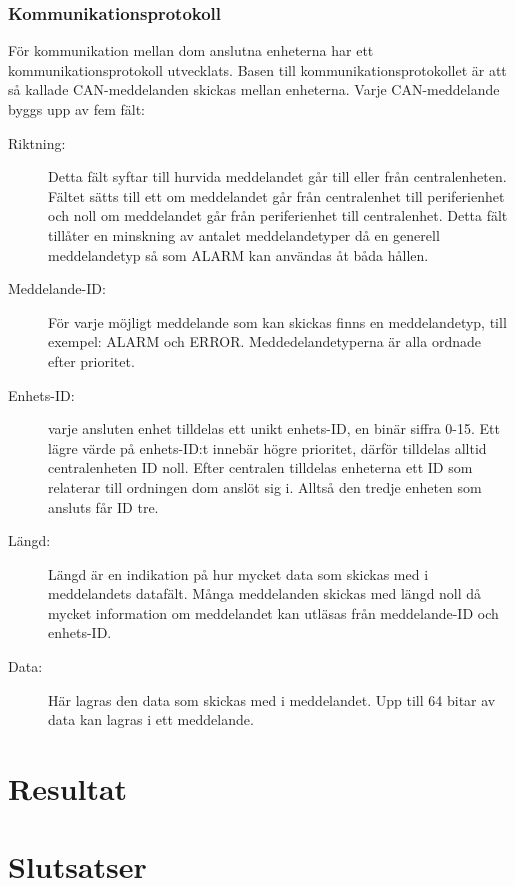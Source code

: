 \documentclass[a4paper]{article}
\begin{document}
\subsubsection{Kommunikationsprotokoll}

För kommunikation mellan dom anslutna enheterna har ett kommunikationsprotokoll utvecklats. Basen till kommunikationsprotokollet är att så kallade CAN-meddelanden skickas mellan enheterna. Varje CAN-meddelande byggs upp av fem fält:
\begin{description}
  \item[Riktning:] Detta fält syftar till hurvida meddelandet går till eller från centralenheten. Fältet sätts till ett om meddelandet går från centralenhet till periferienhet och noll om meddelandet går från periferienhet till centralenhet. Detta fält tillåter en minskning av antalet meddelandetyper då en generell meddelandetyp så som ALARM kan användas åt båda hållen.
  \item[Meddelande-ID:] För varje möjligt meddelande som kan skickas finns en meddelandetyp, till exempel: ALARM och ERROR. Meddedelandetyperna är alla ordnade efter prioritet.
  \item[Enhets-ID:] varje ansluten enhet tilldelas ett unikt enhets-ID, en binär siffra 0-15. Ett lägre värde på enhets-ID:t innebär högre prioritet, därför tilldelas alltid centralenheten ID noll. Efter centralen tilldelas enheterna ett ID som relaterar till ordningen dom anslöt sig i. Alltså den tredje enheten som ansluts får ID tre.
  \item[Längd:] Längd är en indikation på hur mycket data som skickas med i meddelandets datafält. Många meddelanden skickas med längd noll då mycket information om meddelandet kan utläsas från meddelande-ID och enhets-ID.
  \item[Data:] Här lagras den data som skickas med i meddelandet. Upp till 64 bitar av data kan lagras i ett meddelande.
\end{description}


\section{Resultat}

\section{Slutsatser}




\end{document}
